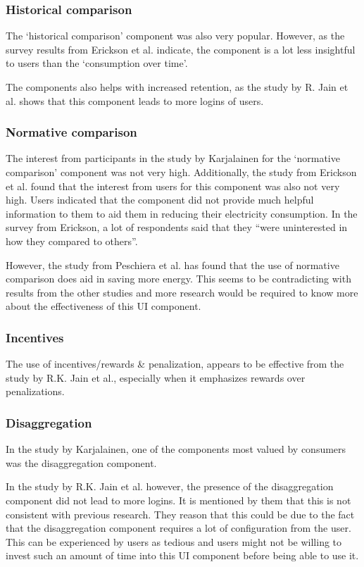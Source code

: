 \documentclass[journal]{vgtc}                %
\begin{document}
\subsubsection{Historical comparison}
The `historical comparison' component was also very popular. However, as the survey results from Erickson et al. indicate, the component is a lot less insightful to users than the `consumption over time'. 

The components also helps with increased retention, as the study by R. Jain et al. shows that this component leads to more logins of users.
\subsubsection{Normative comparison}
The interest from participants in the study by Karjalainen for the `normative comparison' component was not very high. 
Additionally, the study from Erickson et al. found that the interest from users for this component was also not very high. Users indicated that the component did not provide much helpful information to them to aid them in reducing their electricity consumption. In the survey from Erickson, a lot of respondents said that they ``were uninterested in how they compared to others''.

However, the study from Peschiera et al. has found that the use of normative comparison does aid in saving more energy. This seems to be contradicting with results from the other studies and more research would be required to know more about the effectiveness of this UI component.
\subsubsection{Incentives}
The use of incentives/rewards \& penalization, appears to be effective from the study by R.K. Jain et al., especially when it emphasizes rewards over penalizations. %

\subsubsection{Disaggregation}
In the study by Karjalainen, one of the components most valued by consumers was the disaggregation component. 

In the study by R.K. Jain et al. however, the presence of the disaggregation component did not lead to more logins. It is mentioned by them that this is not consistent with previous research. 
They reason that this could be due to the fact that the disaggregation component requires a lot of configuration from the user. This can be experienced by users as tedious and users might not be willing to invest such an amount of time into this UI component before being able to use it.
\end{document}
